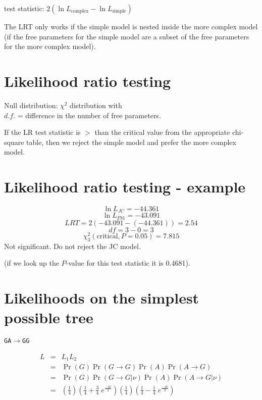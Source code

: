 \documentclass[landscape]{foils}
\begin{document}
test statistic: $2\left(\ln L_{\mbox{complex}} - \ln L_{\mbox{simple}}\right)$

The LRT only works if the simple model is nested inside the more complex model (if the free parameters for the simple model are a subset of the free parameters for the more complex model).

\myNewSlide
\section*{Likelihood ratio testing}
Null distribution: $\chi^2$ distribution with \\
$d.f.$ = difference in the number of free parameters.

If the LR test statistic is $>$ than the critical value from the appropriate chi-square table, then we reject the simple model and prefer the more complex model.

\myNewSlide
\section*{Likelihood ratio testing - example}
\large
$$\ln L_{JC} = -44.361 $$
$$\ln L_{F81} = -43.091 $$
$$LRT = 2(-43.091 - (-44.361)) = 2.54$$
$$df = 3 - 0 = 3$$
$$\chi^2_3(\mbox{critical}, P = 0.05) = 7.815$$
Not significant. Do not reject the JC model.

(if we look up the $P$-value for this test statistic it is 0.4681).

\myNewSlide
\section*{Likelihoods on the simplest possible tree}
\begin{center}
{\Huge
\tt GA$\rightarrow$GG}
\end{center}
\large
\begin{eqnarray*}
	L & = & L_1 L_2 \\
	 & = & \Pr(G)\Pr(G\rightarrow G) \Pr(A)\Pr(A\rightarrow G)\\
	 & = & \Pr(G)\Pr(G\rightarrow G|\nu) \Pr(A)\Pr(A\rightarrow G|\nu) \\
	 & = & \left(\frac{1}{4}\right)\left(\frac{1}{4} + \frac{3}{4}\;e^{\frac{-4\nu}{3}}\right)\left(\frac{1}{4}\right)\left(\frac{1}{4}-\frac{1}{4}\;e^{\frac{-4\nu}{3}}\right)
\end{eqnarray*}
\end{document}
